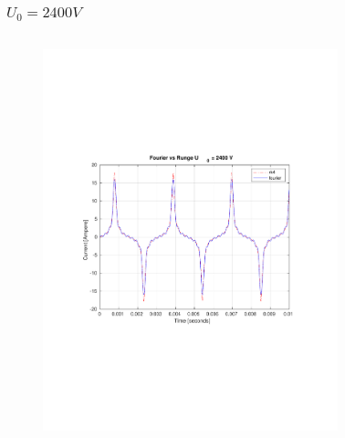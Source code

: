 \documentclass[aspectratio=1610]{beamer}
\begin{document}
\begin{frame}
\frametitle{$U_{0}= 2400V$}
	\begin{columns}
			\begin{figure}
				\includegraphics[scale=0.4]{figs/fourier vs rk4 2400.pdf}
			\end{figure}
			\begin{figure}

\end{figure}
\end{columns}
\end{frame}
\end{document}
